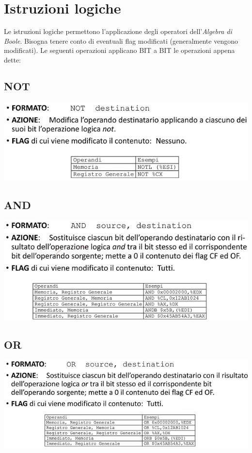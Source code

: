\documentclass[11pt]{report}
\begin{document}
\clearpage

\section{Istruzioni logiche}
Le istruzioni logiche permettono l'applicazione degli operatori dell'\emph{Algebra di Boole}. Bisogna tenere conto di eventuali flag modificati (generalmente vengono modificati). Le seguenti operazioni applicano BIT a BIT le operazioni appena dette:

\subsection{NOT}
\begin{center}
\includegraphics{img/32.PNG}
\end{center}
\subsection{AND}
\begin{center}
\includegraphics{img/33.PNG}
\end{center}
\subsection{OR}
\begin{center}
\includegraphics{img/34.PNG}
\end{center}
\end{document}
